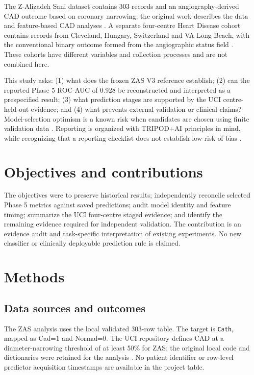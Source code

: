 \documentclass[11pt]{article}
\begin{document}
The Z-Alizadeh Sani dataset contains 303 records and an angiography-derived CAD outcome based on coronary narrowing; the original work describes the data and feature-based CAD analyses \citep{alizadehsani2013,uciZAS}. A separate four-centre Heart Disease cohort contains records from Cleveland, Hungary, Switzerland and VA Long Beach, with the conventional binary outcome formed from the angiographic status field \citep{uciHeart,detrano1989}. These cohorts have different variables and collection processes and are not combined here.

This study asks: (1) what does the frozen ZAS V3 reference establish; (2) can the reported Phase 5 ROC-AUC of 0.928 be reconstructed and interpreted as a prespecified result; (3) what prediction stages are supported by the UCI centre-held-out evidence; and (4) what prevents external validation or clinical claims? Model-selection optimism is a known risk when candidates are chosen using finite validation data \citep{cawley2010}. Reporting is organized with TRIPOD+AI principles in mind, while recognizing that a reporting checklist does not establish low risk of bias \citep{tripodAI,probastAI}.

\section{Objectives and contributions}
The objectives were to preserve historical results; independently reconcile selected Phase 5 metrics against saved predictions; audit model identity and feature timing; summarize the UCI four-centre staged evidence; and identify the remaining evidence required for independent validation. The contribution is an evidence audit and task-specific interpretation of existing experiments. No new classifier or clinically deployable prediction rule is claimed.

\section{Methods}
\subsection{Data sources and outcomes}
The ZAS analysis uses the local validated 303-row table. The target is \texttt{Cath}, mapped as Cad=1 and Normal=0. The UCI repository defines CAD at a diameter-narrowing threshold of at least 50\% for ZAS; the original local code and dictionaries were retained for the analysis \citep{uciZAS}. No patient identifier or row-level predictor acquisition timestamps are available in the project table.
\end{document}
